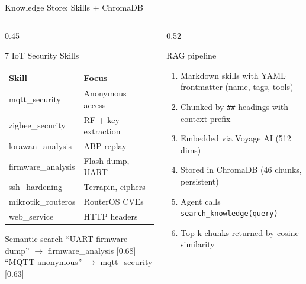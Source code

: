 \documentclass[aspectratio=169]{beamer}
\begin{document}
\begin{frame}{Knowledge Store: Skills + ChromaDB}

\begin{columns}[T]
\begin{column}{0.45\textwidth}
\begin{block}{7 IoT Security Skills}
\footnotesize
\begin{tabular}{ll}
\toprule
\textbf{Skill} & \textbf{Focus} \\
\midrule
mqtt\_security & Anonymous access \\
zigbee\_security & RF + key extraction \\
lorawan\_analysis & ABP replay \\
firmware\_analysis & Flash dump, UART \\
ssh\_hardening & Terrapin, ciphers \\
mikrotik\_routeros & RouterOS CVEs \\
web\_service & HTTP headers \\
\bottomrule
\end{tabular}
\end{block}

\vspace{0.1cm}
\begin{exampleblock}{Semantic search}
\footnotesize
``UART firmware dump'' $\rightarrow$ firmware\_analysis [0.68]\\
``MQTT anonymous'' $\rightarrow$ mqtt\_security [0.63]
\end{exampleblock}
\end{column}

\begin{column}{0.52\textwidth}
\begin{block}{RAG pipeline}
\footnotesize
\begin{enumerate}
    \item Markdown skills with YAML frontmatter (name, tags, tools)
    \item Chunked by \texttt{\#\#} headings with context prefix
    \item Embedded via Voyage AI (512 dims)
    \item Stored in ChromaDB (46 chunks, persistent)
    \item Agent calls \texttt{search\_knowledge(query)}
    \item Top-k chunks returned by cosine similarity
\end{enumerate}
\end{block}


\end{column}
\end{columns}
\end{frame}
\end{document}

